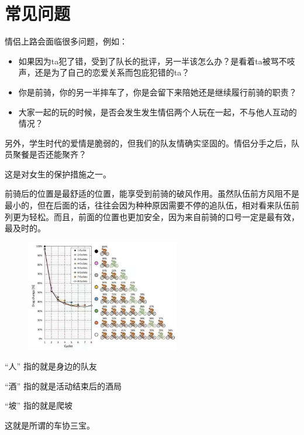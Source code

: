 \documentclass{ctexbook}
\begin{document}
\section{常见问题}
\begin{tcolorbox}[title=为什么禁止情侣上路]
    情侣上路会面临很多问题，例如：

    \begin{itemize}
        \item 如果因为ta犯了错，受到了队长的批评，另一半该怎么办？是看着ta被骂不吱声，还是为了自己的恋爱关系而包庇犯错的ta？
        \item 你是前骑，你的另一半摔车了，你是会留下来陪她还是继续履行前骑的职责？
        \item 大家一起的玩的时候，是否会发生发生情侣两个人玩在一起，不与他人互动的情况？
    \end{itemize}

    另外，学生时代的爱情是脆弱的，但我们的队友情确实坚固的。情侣分手之后，队员聚餐是否还能聚齐？
\end{tcolorbox}
\begin{tcolorbox}[title=为什么要让女生在队列前面]
    这是对女生的保护措施之一。

    前骑后的位置是最舒适的位置，能享受到前骑的破风作用。虽然队伍前方风阻不是最小的，但在后面的话，往往会因为种种原因需要不停的追队伍，相对看来队伍前列更为轻松。而且，前面的位置也更加安全，因为来自前骑的口号一定是最有效，最及时的。
       \begin{figure}[H]
            \begin{center}
            \includegraphics[width=0.6\textwidth]{fig/蹭风队形}
            \end{center}
        \end{figure}
\end{tcolorbox}
\begin{tcolorbox}[title=“人酒坡”是什么]
    “人” 指的就是身边的队友

    “酒” 指的就是活动结束后的酒局

    “坡” 指的就是爬坡

    这就是所谓的车协三宝。
\end{tcolorbox}
\end{document}
